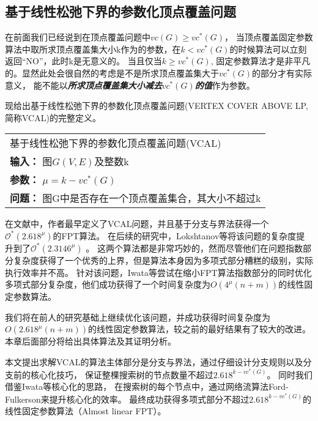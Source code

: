 \subsection{基于线性松弛下界的参数化顶点覆盖问题}
在前面我们已经说到在顶点覆盖问题中$vc(G)\ge vc^*(G)$，
当顶点覆盖固定参数算法中取所求顶点覆盖集大小k作为的参数，在$k < vc^*(G)$的时候算法可以立刻返回“NO”，此时k是无意义的。
当且仅当$k \ge vc^*(G)$, 固定参数算法才是非平凡的。显然此处会很自然的考虑是不是所求顶点覆盖集大于$vc^*(G)$的部分才有实际意义，
能不能以\textbf{\emph{所求顶点覆盖集大小减去$vc^*(G)$的值}}作为参数。

现给出基于线性松弛下界的参数化顶点覆盖问题(VERTEX COVER ABOVE LP, 简称VCAL)的完整定义。\\

\begin{tabular}{| p{0.9\headwidth} |}
  \hline
  基于线性松弛下界的参数化顶点覆盖问题(VCAL) \\
  \textbf{输入：} 图$G(V, E)$及整数k \\
  \textbf{参数：} $\mu = k - vc^*(G)$\\
  \textbf{问题：} 图G中是否存在一个顶点覆盖集合，其大小不超过k\\
  \hline
\end{tabular} \vspace{0.5cm}


在文献\cite{narayanaswamy2012lp}中，作者最早定义了VCAL问题，并且基于分支与界法获得一个$\mathcal{O}^*(2.618^{\mu})$的FPT算法。
在后续的研究中，Lokshtanov等将该问题的复杂度提升到了$\mathcal{O}^*(2.3146^{\mu})$ 。
这两个算法都是非常巧妙的，然而尽管他们在问题指数部分复杂度获得了一个优秀的上界，但是算法本身因为多项式部分糟糕的级别，实际执行效率并不高。
针对该问题，Iwata等尝试在缩小FPT算法指数部分的同时优化多项式部分复杂度，他们成功获得了一个时间复杂度为$O(4^{\mu}(n+m))$的线性固定参数算法。

我们将在前人的研究基础上继续优化该问题，并成功获得时间复杂度为$O(2.618^{\mu}(n+m))$的线性固定参数算法，较之前的最好结果有了较大的改进。
本章后面部分将给出具体算法及其证明分析。

本文提出求解VCAL的算法主体部分是分支与界法，通过仔细设计分支规则以及分支前的核心化技巧，
保证整棵搜索树的节点数量不超过$2.618^{k-vc^*(G)}$。
同时我们借鉴Iwata等核心化的思路，
在搜索树的每个节点中，通过网络流算法Ford-Fulkerson来提升核心化的效率。
最终成功获得多项式部分不超过$2.618^{k-vc^*(G)}$的线性固定参数算法（Almost linear FPT）。
